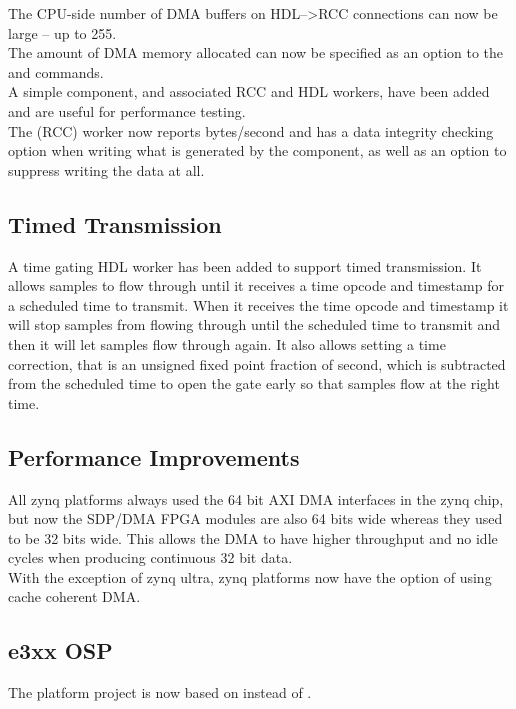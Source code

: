 The CPU-side number of DMA buffers on HDL--\textgreater RCC connections can now be large -- up to 255.\\

The amount of DMA memory allocated can now be specified as an option to the  and  commands.\\

A simple  component, and associated RCC and HDL workers, have been added and are useful for performance testing.\\

The  (RCC) worker now reports bytes/second and has a data integrity checking option when writing what is generated by the  component, as well as an option to suppress writing the data at all.

\subsection{Timed Transmission}
\label{sec:21_timed_xmit}
A time gating HDL worker has been added to support timed transmission.
It allows samples to flow through until it receives a time opcode and
timestamp for a scheduled time to transmit. When it receives the time
opcode and timestamp it will stop samples from flowing through until
the scheduled time to transmit and then it will let samples flow through
again. It also allows setting a time correction, that is an unsigned
fixed point fraction of second, which is subtracted from the scheduled
time to open the gate early so that samples flow at the right time.

\subsection{Performance Improvements}
\label{sec:21_perf}
All zynq platforms always used the 64 bit AXI DMA interfaces in the
zynq chip, but now the SDP/DMA FPGA modules are also 64 bits wide
whereas they used to be 32 bits wide.  This allows the DMA to have
higher throughput and no idle cycles when producing continuous 32 bit data.\\

With the exception of zynq ultra, zynq platforms now have the option of using cache coherent DMA.

\subsection{e3xx OSP}
\label{sec:21_e3xx}
The  platform project is now based on  instead of .

